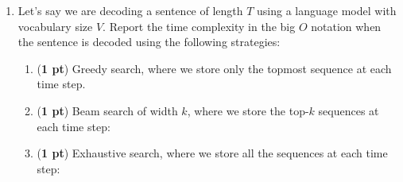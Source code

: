 \documentclass[11pt, letterpaper]{article}
\begin{document}
\begin{enumerate}
\begin{enumerate}
        
    \end{enumerate}

    \item Let's say we are decoding a sentence of length $T$ using a language model with vocabulary size $V$. Report the time complexity in the big $O$ notation when the sentence is decoded using the following strategies:

    \begin{enumerate}
    \item (\textbf{1 pt}) Greedy search, where we store only the topmost sequence at each time step. 
    

    
    \item (\textbf{1 pt}) Beam search of width $k$, where we store the top-$k$ sequences at each time step: 


    
    \item (\textbf{1 pt}) Exhaustive search, where we store all the sequences at each time step: 
    
    
    \end{enumerate}

\end{enumerate}
\end{document}
